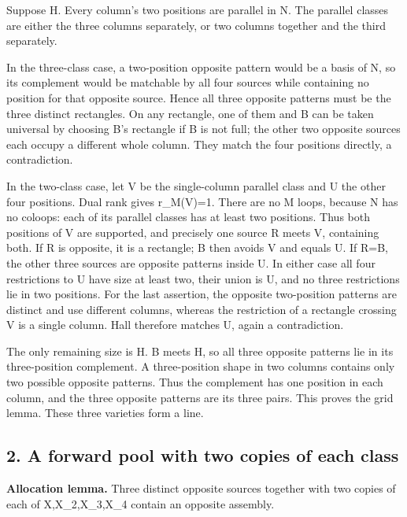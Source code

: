 \documentclass[
  10pt,
]{article}
\begin{document}
Suppose \textbar H. Every column's two positions are parallel
in N. The parallel classes are either the three columns separately, or
two columns together and the third separately.

In the three-class case, a two-position opposite pattern would be a
basis of N, so its complement would be matchable by all four sources
while containing no position for that opposite source. Hence all three
opposite patterns must be the three distinct rectangles. On any
rectangle, one of them and B can be taken universal by choosing B's
rectangle if B is not full; the other two opposite sources each occupy a
different whole column. They match the four positions directly, a
contradiction.

In the two-class case, let V be the single-column parallel class and U
the other four positions. Dual rank gives r\_M(V)=1. There are no M
loops, because N has no coloops: each of its parallel classes has at
least two positions. Thus both positions of V are supported, and
precisely one source R meets V, containing both. If R is opposite, it is
a rectangle; B then avoids V and equals U. If R=B, the other three
sources are opposite patterns inside U. In either case all four
restrictions to U have size at least two, their union is U, and no three
restrictions lie in two positions. For the last assertion, the opposite
two-position patterns are distinct and use different columns, whereas
the restriction of a rectangle crossing V is a single column. Hall
therefore matches U, again a contradiction.

The only remaining size is \textbar H. B meets H, so all three
opposite patterns lie in its three-position complement. A three-position
shape in two columns contains only two possible opposite patterns. Thus
the complement has one position in each column, and the three opposite
patterns are its three pairs. This proves the grid lemma. These three
varieties form a line.

\hypertarget{a-forward-pool-with-two-copies-of-each-class}{%
\subsection*{2. A forward pool with two copies of each
class}\label{a-forward-pool-with-two-copies-of-each-class}}

\textbf{Allocation lemma.} Three distinct opposite sources together with
two copies of each of X,X\_2,X\_3,X\_4 contain an opposite assembly.
\end{document}
